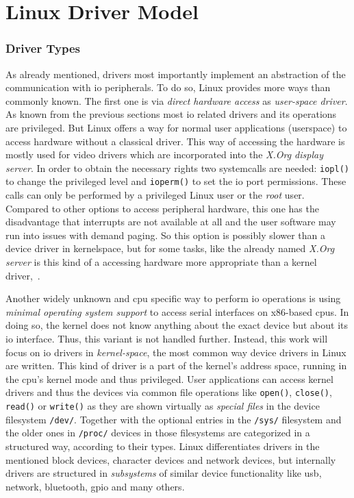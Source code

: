   
\section{Linux Driver Model}
\subsubsection*{Driver Types}
As already mentioned, drivers most importantly implement an abstraction of the communication with \ac{io} peripherals.
To do so, Linux provides more ways than commonly known.
The first one is via \textit{direct hardware access} as \textit{user-space driver}.
As known from the previous sections most \ac{io} related drivers and its operations are privileged.
But Linux offers a way for normal user applications (userspace) to access hardware without a classical driver.
This way of accessing the hardware is mostly used for video drivers which are incorporated into the \textit{X.Org display server}.
In order to obtain the necessary rights two systemcalls are needed: \texttt{iopl()} to change the privileged level and \texttt{ioperm()} to set the \ac{io} port permissions.
These calls can only be performed by a privileged Linux user or the \textit{root} user.
Compared to other options to access peripheral hardware, this one has the disadvantage that interrupts are not available at all and the user software may run into issues with demand paging.
So this option is possibly slower than a device driver in kernelspace, but for some tasks, like the already named \textit{X.Org server} is this kind of a accessing hardware more appropriate than a kernel driver\cite{lfd430},~\cite{glatz2015betriebssysteme}.

Another widely unknown and \ac{cpu} specific way to perform \ac{io} operations is using \textit{minimal operating system support} to access serial interfaces on x86-based \acp{cpu}.
In doing so, the kernel does not know anything about the exact device but about its \ac{io} interface\cite{glatz2015betriebssysteme}.
Thus, this variant is not handled further.
Instead, this work will focus on \ac{io} drivers in \textit{kernel-space}, the most common way device drivers in Linux are written.
This kind of driver is a part of the kernel's address space, running in the \ac{cpu}'s kernel mode and thus privileged.
User applications can access kernel drivers and thus the devices via common file operations like \texttt{open()}, \texttt{close()}, \texttt{read()} or \texttt{write()} as they are shown virtually as \textit{special files} in the device filesystem \texttt{/dev/}.
Together with the optional entries in the \texttt{/sys/} filesystem and the older ones in \texttt{/proc/} devices in those filesystems are categorized in a structured way, according to their types\cite{glatz2015betriebssysteme}.
Linux differentiates drivers in the mentioned block devices, character devices and network devices, but internally drivers are structured in \textit{subsystems} of similar device functionality like usb, network, bluetooth, gpio and many others\cite{quade2016Linux}. 

